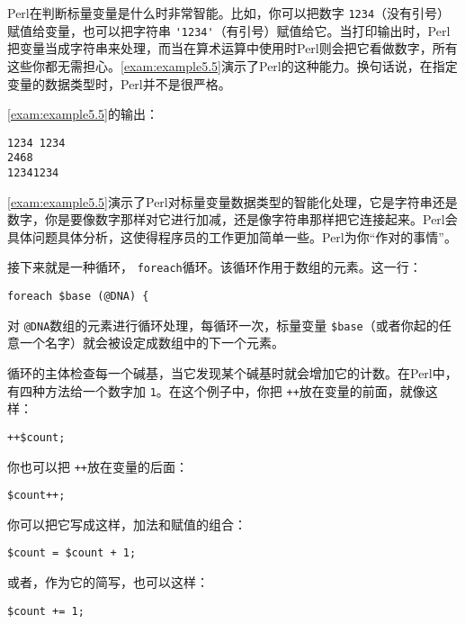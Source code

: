 Perl在判断标量变量是什么时非常智能。比如，你可以把数字 \verb|1234|（没有引号）赋值给变量，也可以把字符串 \verb|'1234'|（有引号）赋值给它。当打印输出时，Perl把变量当成字符串来处理，而当在算术运算中使用时Perl则会把它看做数字，所有这些你都无需担心。\autoref{exam:example5.5}演示了Perl的这种能力。换句话说，在指定变量的数据类型时，Perl并不是很严格。



\autoref{exam:example5.5}的输出：

\begin{lstlisting}
1234 1234
2468
12341234
\end{lstlisting}

\autoref{exam:example5.5}演示了Perl对标量变量数据类型的智能化处理，它是字符串还是数字，你是要像数字那样对它进行加减，还是像字符串那样把它连接起来。Perl会具体问题具体分析，这使得程序员的工作更加简单一些。Perl为你“作对的事情”。

接下来就是一种循环， \verb|foreach|循环。该循环作用于数组的元素。这一行：

\begin{lstlisting}
foreach $base (@DNA) {
\end{lstlisting}

对 \verb|@DNA|数组的元素进行循环处理，每循环一次，标量变量 \verb|$base|（或者你起的任意一个名字）就会被设定成数组中的下一个元素。

循环的主体检查每一个碱基，当它发现某个碱基时就会增加它的计数。在Perl中，有四种方法给一个数字加 \verb|1|。在这个例子中，你把 \verb|++|放在变量的前面，就像这样：

\begin{lstlisting}
++$count; 
\end{lstlisting}

你也可以把 \verb|++|放在变量的后面：

\begin{lstlisting}
$count++;
\end{lstlisting}

你可以把它写成这样，加法和赋值的组合：

\begin{lstlisting}
$count = $count + 1;
\end{lstlisting}

或者，作为它的简写，也可以这样：

\begin{lstlisting}
$count += 1;
\end{lstlisting}

